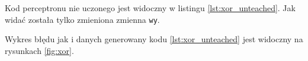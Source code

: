 \documentclass[pointlessnumbers, abstracton, headsepline, a4paper]{scrartcl}
\begin{document}
Kod perceptronu nie uczonego jest widoczny w listingu \ref{lst:xor_unteached}. Jak widać została tylko zmieniona zmienna \texttt{wy}.

\begin{center}
\begin{minipage}{0.5\textwidth}
\lstset{captionpos=b,caption=Kod nie uczonej bramki XOR,label=lst:xor_unteached}

\end{minipage}
\end{center}

Wykres błędu jak i danych generowany kodu \ref{lst:xor_unteached} jest widoczny na rysunkach \ref{fig:xor}.

\begin{figure}[!h]
\centering
{}

\end{figure}
\end{document}
